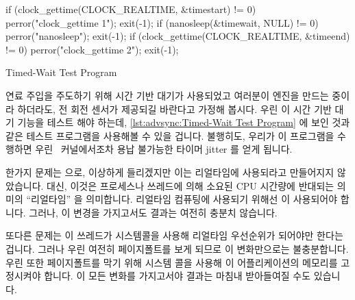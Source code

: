 \fi

\begin{listing}[tb]
\begin{fcvlabel}
\begin{VerbatimL}
if (clock_gettime(CLOCK_REALTIME, &timestart) != 0) {
	perror("clock_gettime 1");
	exit(-1);
}
if (nanosleep(&timewait, NULL) != 0) {
	perror("nanosleep");
	exit(-1);
}
if (clock_gettime(CLOCK_REALTIME, &timeend) != 0) {
	perror("clock_gettime 2");
	exit(-1);
}
\end{VerbatimL}
\end{fcvlabel}
\caption{Timed-Wait Test Program}
\label{lst:advsync:Timed-Wait Test Program}
\end{listing}

연료 주입을 주도하기 위해 시간 기반 대기가 사용되었고 여러분이 엔진을 만드는
중이라 하더라도, 전 회전 센서가 제공되길 바란다고 가정해 봅시다.
우린 이 시간 기반 대기 기능을 테스트 해야 하는데,
\cref{lst:advsync:Timed-Wait Test Program} 에 보인 것과 같은 테스트 프로그램을
사용해볼 수 있을 겁니다.
불행히도, 우리가 이 프로그램을 수행하면 우린 \rt\ 커널에서조차 용납 불가능한
타이머 jitter 를 얻게 됩니다.

한가지 문제는  으로, 이상하게 들리겠지만 이는 리얼타임에
사용되라고 만들어지지 않았습니다.
대신, 이것은 프로세스나 쓰레드에 의해 소요된 CPU 시간량에 반대되는 의미의
``리얼타임'' 을 의미합니다.
리얼타임 컴퓨팅에 사용되기 위해선  이 사용되어야 합니다.
그러나, 이 변경을 가지고서도 결과는 여전히 충분치 않습니다.

또다른 문제는 이 쓰레드가  시스템콜을 사용해 리얼타임
우선순위가 되어야만 한다는 겁니다.
그러나 우린 여전히 페이지폴트를 보게 되므로 이 변화만으로는 불충분합니다.
우린 또한 페이지폴트를 막기 위해  시스템 콜을 사용해 이
어플리케이션의 메모리를 고정시켜야 합니다.
이 모든 변화를 가지고서야 결과는 마침내 받아들여질 수도 있습니다.

